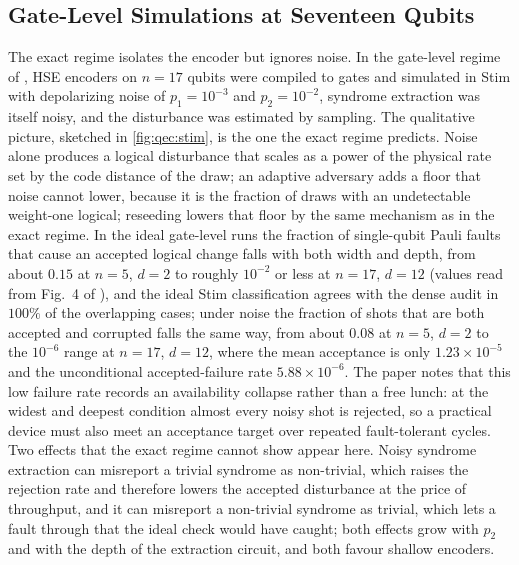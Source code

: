 \subsection{Gate-Level Simulations at Seventeen Qubits}\label{sec:qec:results17}

The exact regime isolates the encoder but ignores noise. In the gate-level regime of \cite{guo2026qecaudit}, HSE encoders on $n=17$ qubits were compiled to gates and simulated in Stim with depolarizing noise of $p_1=10^{-3}$ and $p_2=10^{-2}$, syndrome extraction was itself noisy, and the disturbance was estimated by sampling. The qualitative picture, sketched in \cref{fig:qec:stim}, is the one the exact regime predicts. Noise alone produces a logical disturbance that scales as a power of the physical rate set by the code distance of the draw; an adaptive adversary adds a floor that noise cannot lower, because it is the fraction of draws with an undetectable weight-one logical; reseeding lowers that floor by the same mechanism as in the exact regime. In the ideal gate-level runs the fraction of single-qubit Pauli faults that cause an accepted logical change falls with both width and depth, from about $0.15$ at $n=5$, $d=2$ to roughly $10^{-2}$ or less at $n=17$, $d=12$ (values read from Fig.~4 of \cite{guo2026qecaudit}), and the ideal Stim classification agrees with the dense audit in $100\%$ of the overlapping cases; under noise the fraction of shots that are both accepted and corrupted falls the same way, from about $0.08$ at $n=5$, $d=2$ to the $10^{-6}$ range at $n=17$, $d=12$, where the mean acceptance is only $1.23\times10^{-5}$ and the unconditional accepted-failure rate $5.88\times10^{-6}$. The paper notes that this low failure rate records an availability collapse rather than a free lunch: at the widest and deepest condition almost every noisy shot is rejected, so a practical device must also meet an acceptance target over repeated fault-tolerant cycles. Two effects that the exact regime cannot show appear here. Noisy syndrome extraction can misreport a trivial syndrome as non-trivial, which raises the rejection rate and therefore lowers the accepted disturbance at the price of throughput, and it can misreport a non-trivial syndrome as trivial, which lets a fault through that the ideal check would have caught; both effects grow with $p_2$ and with the depth of the extraction circuit, and both favour shallow encoders.

